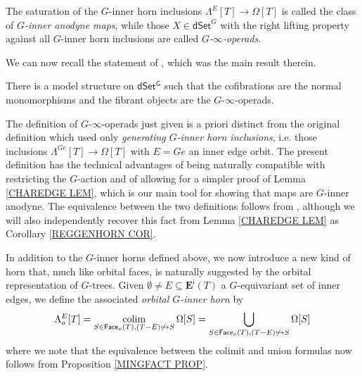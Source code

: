 \documentclass[a4paper,10pt
]{article}%
\begin{document}
The saturation of the $G$-inner horn inclusions 
$\Lambda^E[T] \to \Omega[T]$
is called the class of \textit{$G$-inner anodyne maps}, 
while those $X \in \mathsf{dSet}^G$
with the right lifting property against all $G$-inner horn inclusions are called \textit{$G$-$\infty$-operads}.

We can now recall the statement of \cite[Thm 2.1]{Per17}, which was the main result therein.

\begin{theorem}
	There is a model structure on $\mathsf{dSet^G}$
	such that the cofibrations are the normal monomorphisms and the fibrant objects are the $G$-$\infty$-operads.
\end{theorem}


\begin{remark}
The definition of $G$-$\infty$-operads just given is a priori distinct from the original definition \cite[Def. 6.12]{Per17} which used only 
\textit{generating $G$-inner horn inclusions}, i.e. 
those inclusions $\Lambda^{Ge}[T] \to \Omega[T]$ with $E=Ge$ an inner edge orbit.
The present definition has the technical advantages of being naturally compatible with restricting the $G$-action and of allowing for a simpler proof of Lemma \ref{CHAREDGE LEM}, 
which is our main tool for showing that maps
are $G$-inner anodyne.
The equivalence between the two definitions follows from 
\cite[Prop. 6.17]{Per17},
although we will also independently recover this fact
from Lemma \ref{CHAREDGE LEM} as Corollary \ref{REGGENHORN COR}.
\end{remark}


In addition to the $G$-inner horns defined above, we now introduce a new kind of horn that, much like orbital faces,
is naturally suggested by the orbital representation of $G$-trees.
Given $\emptyset \neq E \subseteq \boldsymbol{E}^{\mathsf{i}}(T)$ a $G$-equivariant set of inner edges, we define the associated 
\textit{orbital $G$-inner horn} by
\[
	\Lambda^{E}_o[T] = 
	\mathop{\operatorname{colim}}_{S \in 
	\mathsf{Face}_o(T),
	(T - E) \not \hookrightarrow S}
	\Omega[S] =
	\bigcup_{S \in 
	\mathsf{Face}_o(T),
	(T - E) \not \hookrightarrow S}
	\Omega[S]
\]
where we note that the equivalence between the colimit and union formulas now follows from Proposition \ref{MINGFACT PROP}.
\end{document}

